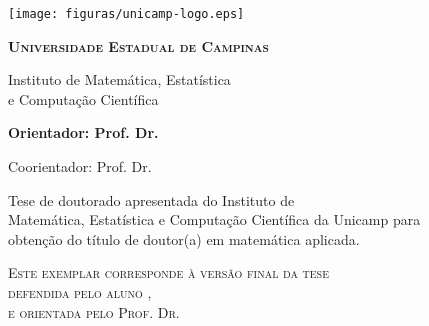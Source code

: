 \texttt{[image: figuras/unicamp-logo.eps]}
\begin{center}
    {\large \scshape \bfseries Universidade Estadual de Campinas
    \vspace{.5cm}
    
    Instituto de Matem\'atica, Estat\'istica \\
    e Computa\c c\~ao Cient\'ifica}
\end{center}
\vspace{.7cm}
\begin{center}
    {\large \scshape \bfseries \autor}
\end{center}
\vspace{.7cm}
\begin{center}
    {\Large \scshape \bfseries \titulo}
\end{center}
\vspace{.8cm}
{\bfseries
\noindent
Orientador: Prof. Dr. \orientador
\vspace{.25cm}

\noindent
Coorientador: Prof. Dr. \coorientador
}

\vspace{.5cm}
\begin{flushright}
    \begin{minipage}[c]{.8\textwidth}
        \begin{flushright}
            Tese de doutorado %
            apresentada do Instituto de \\ Matem\'atica,
            Estat\'istica e Computa\c c\~ao Cient\'ifica
            da Unicamp para \\ obten\c c\~ao do t\'itulo de
            doutor(a) %
            em
            matem\'atica aplicada.
        \end{flushright}
    \end{minipage}
\end{flushright}
\vspace{.5cm}
\noindent
{\footnotesize \scshape
Este exemplar corresponde \`a vers\~ao final da 
tese \\  %
defendida pelo aluno \autor,\\
e orientada pelo Prof. Dr. \orientador
}
\vspace{1cm}

